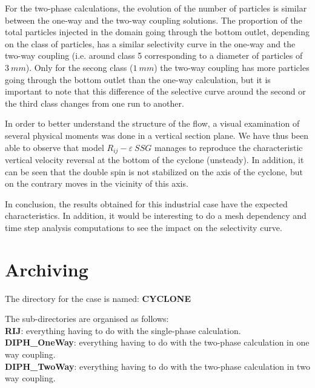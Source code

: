 For the two-phase calculations, the evolution of the number of particles is similar between the one-way and the two-way coupling solutions. The proportion of the total particles injected in the domain going through the bottom outlet, depending on the class of particles, has a similar selectivity curve in the one-way and the two-way coupling (i.e. around class 5 corresponding to a diameter of particles of $3~mm$). Only for the secong class ($1~mm$) the two-way coupling has more particles going through the bottom outlet than the one-way calculation, but it is important to note that this difference of the selective curve around the second or the third class changes from one run to another.

In order to better understand the structure of the flow, a visual examination of several physical moments
was done in a vertical section plane. We have thus been able to observe that model $R_{ij}-\varepsilon~SSG$ manages to reproduce the characteristic vertical velocity reversal at the bottom of the cyclone
(unsteady). In addition, it can be seen that the double spin is not stabilized on the axis of the
cyclone, but on the contrary moves in the vicinity of this axis.

In conclusion, the results obtained for this industrial case have the expected characteristics. In addition, it would be interesting to do a mesh dependency and time step analysis computations to see the impact on the selectivity curve.


\clearpage

\section{Archiving}

The directory for the case is named: \textbf{CYCLONE}

The sub-directories are organised as follows:
\medskip\\
\hspace*{2cm}\textbf{RIJ}: everything having to do with the single-phase calculation.
\medskip\\
\hspace*{2cm}\textbf{DIPH\_OneWay}: everything having to do with the two-phase calculation in one way coupling.
\medskip\\
\hspace*{2cm}\textbf{DIPH\_TwoWay}: everything having to do with the two-phase calculation in two way coupling.

